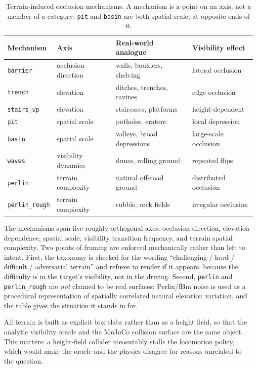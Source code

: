 \documentclass[utf8]{FrontiersinHarvard}
\begin{document}
\begin{table}[h]
\caption{Terrain-induced occlusion mechanisms. A mechanism is a point on an axis, not a
member of a category: \texttt{pit} and \texttt{basin} are both spatial scale, at
opposite ends of it.}
\label{tab:mechanisms}
\begin{tabular}{llll}
\toprule
Mechanism & Axis & Real-world analogue & Visibility effect \\
\midrule
\texttt{barrier} & occlusion direction & walls, boulders, shelving & lateral occlusion \\
\texttt{trench} & elevation & ditches, trenches, ravines & edge occlusion \\
\texttt{stairs\_up} & elevation & staircases, platforms & height-dependent \\
\texttt{pit} & spatial scale & potholes, craters & local depression \\
\texttt{basin} & spatial scale & valleys, broad depressions & large-scale occlusion \\
\texttt{waves} & visibility dynamics & dunes, rolling ground & repeated flips \\
\texttt{perlin} & terrain complexity & natural off-road ground & distributed occlusion \\
\texttt{perlin\_rough} & terrain complexity & rubble, rock fields & irregular occlusion \\
\bottomrule
\end{tabular}
\end{table}

The mechanisms span five roughly orthogonal axes: occlusion direction, elevation
dependence, spatial scale, visibility transition frequency, and terrain spatial
complexity. Two points of framing are enforced mechanically rather than left to
intent. First, the taxonomy is checked for the wording ``challenging / hard / difficult
/ adversarial terrain'' and refuses to render if it appears, because the difficulty is
in the target's visibility, not in the driving. Second, \texttt{perlin} and
\texttt{perlin\_rough} are \emph{not} claimed to be real surfaces: Perlin/fBm noise is
used as a procedural representation of spatially correlated natural elevation variation,
and the table gives the situation it stands in for.

All terrain is built as explicit box slabs rather than as a height field, so that the
analytic visibility oracle and the MuJoCo collision surface are the same object. This
matters: a height-field collider measurably stalls the locomotion policy, which would
make the oracle and the physics disagree for reasons unrelated to the question.
\end{document}
